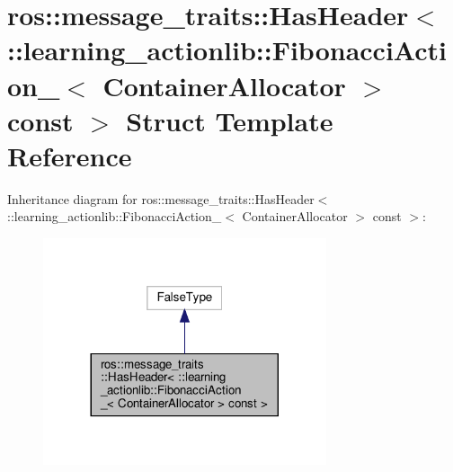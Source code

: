 \hypertarget{structros_1_1message__traits_1_1HasHeader_3_01_1_1learning__actionlib_1_1FibonacciAction___3_01C4f386d2aa7585aea595167ee8f9ea43e}{}\section{ros\+:\+:message\+\_\+traits\+:\+:Has\+Header$<$ \+:\+:learning\+\_\+actionlib\+:\+:Fibonacci\+Action\+\_\+$<$ Container\+Allocator $>$ const $>$ Struct Template Reference}
\label{structros_1_1message__traits_1_1HasHeader_3_01_1_1learning__actionlib_1_1FibonacciAction___3_01C4f386d2aa7585aea595167ee8f9ea43e}


Inheritance diagram for ros\+:\+:message\+\_\+traits\+:\+:Has\+Header$<$ \+:\+:learning\+\_\+actionlib\+:\+:Fibonacci\+Action\+\_\+$<$ Container\+Allocator $>$ const $>$\+:
\nopagebreak
\begin{figure}[H]
\begin{center}
\leavevmode
\includegraphics[width=236pt]{structros_1_1message__traits_1_1HasHeader_3_01_1_1learning__actionlib_1_1FibonacciAction___3_01C0b88ac9f90b7ba25ddf0389c95623f95}
\end{center}
\end{figure}


